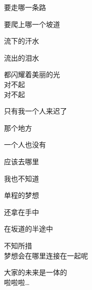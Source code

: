 要走哪一条路

要爬上哪一个坡道

流下的汗水

流出的泪水

都闪耀着美丽的光
\\

对不起
\\

对不起

只有我一个人来迟了

那个地方

一个人也没有

应该去哪里

我也不知道

单程的梦想

还拿在手中

在坂道的半途中

不知所措
\\

梦想会在哪里连接在一起呢

大家的未来是一体的
\\

啦啦啦…
\\
